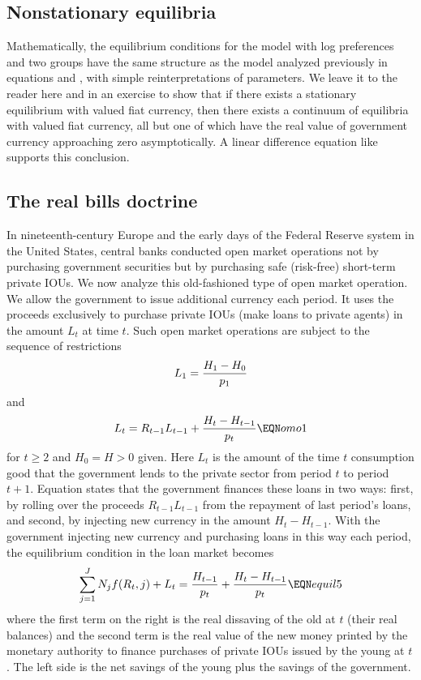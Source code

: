 \subsection{Nonstationary equilibria}

Mathematically, the equilibrium conditions for the
 model with log preferences and
two groups have the same structure as the model analyzed
previously in equations  and ,
 with simple reinterpretations of
parameters.  We leave it to the reader here and in an exercise
to show that if there exists a stationary equilibrium with
valued fiat currency, then there exists a continuum of
equilibria with valued fiat currency, all but one of which
have the real value of government currency approaching
zero asymptotically.  A linear difference equation
like  supports this conclusion.

\subsection{The real bills doctrine}

In nineteenth-century Europe and the early days of the Federal Reserve system
in the United States, central banks conducted open market operations not by
purchasing government securities but by purchasing safe (risk-free)
short-term private IOUs.
 We now analyze this old-fashioned type of
open market operation. We allow the government to issue additional
currency each period.  It uses the proceeds exclusively to purchase
private IOUs (make loans to private agents) in the amount $L_t$ at time $t$.
 Such open market
operations are subject to the sequence of restrictions
$$ L_1 = {H_1 - H_0 \over p_1} $$
and 
$$L_t = R_{t-1} L_{t-1} + {H_t - H_{t-1} \over p_t} \EQN omo1  $$
for $t \geq 2$ and $H_0 = H>0$ given.
Here $L_t$ is the amount of the time $t$ consumption good that the government
lends to the private sector from period $t$ to period $t+1$.
Equation  states that the government finances these loans in two ways: first,
by rolling over the  proceeds
$R_{t-1} L_{t-1}$ from the repayment of last period's loans, and second, by injecting new  currency  in the
amount $H_t-H_{t-1}$.  With the government injecting new currency and purchasing loans in this
way each period, the equilibrium condition in the loan market becomes
$$ \sum_{j=1}^J N_j f(R_t, j) + L_t = {H_{t-1}\over p_t}
    + {H_{t}- H_{t-1} \over p_t}   \EQN equil5
$$
where the first term on the right is the real dissaving of the
old at $t$ (their real balances) and the second term
is the real value of the new money printed by the monetary
authority to finance purchases of private IOUs issued
by the young at $t$.  The left side is the net savings of
the young plus the savings of the government.

